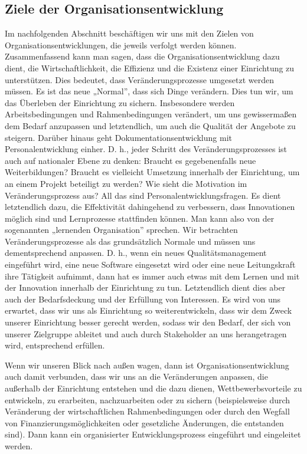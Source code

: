 \documentclass[
  letterpaper,
]{book}
\begin{document}
\subsection{Ziele der
Organisationsentwicklung}\label{ziele-der-organisationsentwicklung}

Im nachfolgenden Abschnitt beschäftigen wir uns mit den Zielen von
Organisationsentwicklungen, die jeweils verfolgt werden können.
Zusammenfassend kann man sagen, dass die Organisationsentwicklung dazu
dient, die Wirtschaftlichkeit, die Effizienz und die Existenz einer
Einrichtung zu unterstützen. Dies bedeutet, dass Veränderungsprozesse
umgesetzt werden müssen. Es ist das neue „Normal'', dass sich Dinge
verändern. Dies tun wir, um das Überleben der Einrichtung zu sichern.
Insbesondere werden Arbeitsbedingungen und Rahmenbedingungen verändert,
um uns gewissermaßen dem Bedarf anzupassen und letztendlich, um auch die
Qualität der Angebote zu steigern. Darüber hinaus geht
Dokumentationsentwicklung mit Personalentwicklung einher. D. h., jeder
Schritt des Veränderungsprozesses ist auch auf nationaler Ebene zu
denken: Braucht es gegebenenfalls neue Weiterbildungen? Braucht es
vielleicht Umsetzung innerhalb der Einrichtung, um an einem Projekt
beteiligt zu werden? Wie sieht die Motivation im Veränderungsprozess
aus? All das sind Personalentwicklungsfragen. Es dient letztendlich
dazu, die Effektivität dahingehend zu verbessern, dass Innovationen
möglich sind und Lernprozesse stattfinden können. Man kann also von der
sogenannten „lernenden Organisation'' sprechen. Wir betrachten
Veränderungsprozesse als das grundsätzlich Normale und müssen uns
dementsprechend anpassen. D. h., wenn ein neues Qualitätsmanagement
eingeführt wird, eine neue Software eingesetzt wird oder eine neue
Leitungskraft ihre Tätigkeit aufnimmt, dann hat es immer auch etwas mit
dem Lernen und mit der Innovation innerhalb der Einrichtung zu tun.
Letztendlich dient dies aber auch der Bedarfsdeckung und der Erfüllung
von Interessen. Es wird von uns erwartet, dass wir uns als Einrichtung
so weiterentwickeln, dass wir dem Zweck unserer Einrichtung besser
gerecht werden, sodass wir den Bedarf, der sich von unserer Zielgruppe
ableitet und auch durch Stakeholder an uns herangetragen wird,
entsprechend erfüllen.

Wenn wir unseren Blick nach außen wagen, dann ist
Organisationsentwicklung auch damit verbunden, dass wir uns an die
Veränderungen anpassen, die außerhalb der Einrichtung entstehen und die
dazu dienen, Wettbewerbsvorteile zu entwickeln, zu erarbeiten,
nachzuarbeiten oder zu sichern (beispielsweise durch Veränderung der
wirtschaftlichen Rahmenbedingungen oder durch den Wegfall von
Finanzierungsmöglichkeiten oder gesetzliche Änderungen, die entstanden
sind). Dann kann ein organisierter Entwicklungsprozess eingeführt und
eingeleitet werden.
\end{document}
